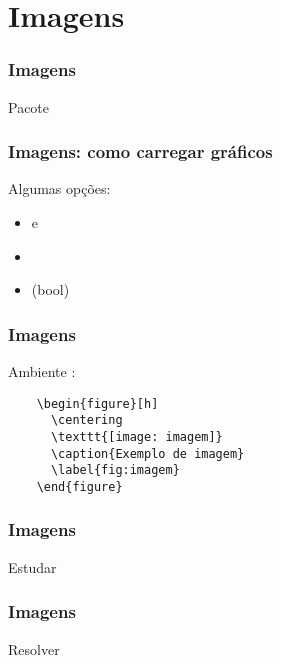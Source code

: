 \section{Imagens}

\begin{frame}
  \frametitle{Imagens}
  \LARGE
  Pacote 
\end{frame}

\begin{frame}[fragile]
  \frametitle{Imagens: como carregar gráficos}
  \Large
  \vspace{1em}

  Algumas opções:
  \begin{itemize}
    \item {} e 
    \item {}
    \item {} (bool)
  \end{itemize}
\end{frame}

\begin{frame}[fragile]
  \frametitle{Imagens}
  \Large
  Ambiente :

    \begin{verbatim}
    \begin{figure}[h]
      \centering
      \texttt{[image: imagem]}
      \caption{Exemplo de imagem}
      \label{fig:imagem}
    \end{figure}
    \end{verbatim}
\end{frame}

\begin{frame}
  \frametitle{Imagens}
  \Huge
  Estudar 
\end{frame}

\begin{frame}
  \frametitle{Imagens}
  \Huge
  Resolver 
\end{frame}
